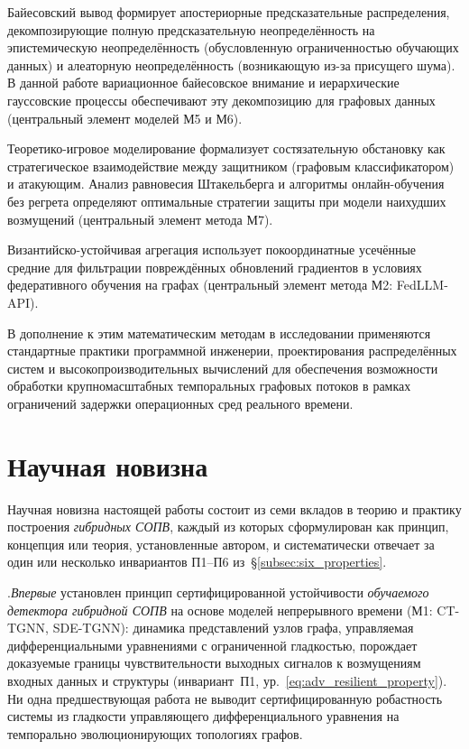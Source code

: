 Байесовский вывод формирует апостериорные предсказательные распределения, декомпозирующие полную предсказательную неопределённость на эпистемическую неопределённость (обусловленную ограниченностью обучающих данных) и алеаторную неопределённость (возникающую из-за присущего шума). В данной работе вариационное байесовское внимание и иерархические гауссовские процессы обеспечивают эту декомпозицию для графовых данных (центральный элемент моделей М5 и М6).

Теоретико-игровое моделирование формализует состязательную обстановку как стратегическое взаимодействие между защитником (графовым классификатором) и атакующим. Анализ равновесия Штакельберга и алгоритмы онлайн-обучения без регрета определяют оптимальные стратегии защиты при модели наихудших возмущений (центральный элемент метода М7).

Византийско-устойчивая агрегация использует покоординатные усечённые средние для фильтрации повреждённых обновлений градиентов в условиях федеративного обучения на графах (центральный элемент метода М2: FedLLM-API).

В дополнение к этим математическим методам в исследовании применяются стандартные практики программной инженерии, проектирования распределённых систем и высокопроизводительных вычислений для обеспечения возможности обработки крупномасштабных темпоральных графовых потоков в рамках ограничений задержки операционных сред реального времени.

\section*{Научная новизна}

Научная новизна настоящей работы состоит из семи вкладов в теорию
и практику построения \emph{гибридных СОПВ}, каждый из которых
сформулирован как принцип, концепция или теория, установленные
автором, и систематически отвечает за один или несколько инвариантов
П1--П6 из~\S\ref{subsec:six_properties}.

.\quad \emph{Впервые} установлен принцип сертифицированной
устойчивости \emph{обучаемого детектора гибридной СОПВ} на
основе моделей непрерывного времени (М1: CT-TGNN, SDE-TGNN):
динамика представлений узлов графа, управляемая дифференциальными
уравнениями с ограниченной гладкостью, порождает доказуемые границы
чувствительности выходных сигналов к возмущениям входных данных и
структуры (инвариант~П1, ур.~\eqref{eq:adv_resilient_property}). Ни
одна предшествующая работа не выводит сертифицированную робастность
системы из гладкости управляющего дифференциального уравнения на
темпорально эволюционирующих топологиях графов.

